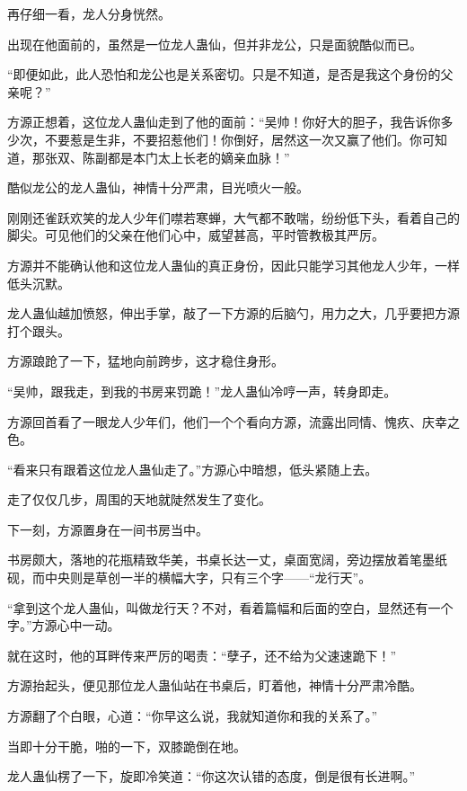 
\begin{this_body}

再仔细一看，龙人分身恍然。

出现在他面前的，虽然是一位龙人蛊仙，但并非龙公，只是面貌酷似而已。

“即便如此，此人恐怕和龙公也是关系密切。只是不知道，是否是我这个身份的父亲呢？”

方源正想着，这位龙人蛊仙走到了他的面前：“吴帅！你好大的胆子，我告诉你多少次，不要惹是生非，不要招惹他们！你倒好，居然这一次又赢了他们。你可知道，那张双、陈副都是本门太上长老的嫡亲血脉！”

酷似龙公的龙人蛊仙，神情十分严肃，目光喷火一般。

刚刚还雀跃欢笑的龙人少年们噤若寒蝉，大气都不敢喘，纷纷低下头，看着自己的脚尖。可见他们的父亲在他们心中，威望甚高，平时管教极其严厉。

方源并不能确认他和这位龙人蛊仙的真正身份，因此只能学习其他龙人少年，一样低头沉默。

龙人蛊仙越加愤怒，伸出手掌，敲了一下方源的后脑勺，用力之大，几乎要把方源打个跟头。

方源踉跄了一下，猛地向前跨步，这才稳住身形。

“吴帅，跟我走，到我的书房来罚跪！”龙人蛊仙冷哼一声，转身即走。

方源回首看了一眼龙人少年们，他们一个个看向方源，流露出同情、愧疚、庆幸之色。

“看来只有跟着这位龙人蛊仙走了。”方源心中暗想，低头紧随上去。

走了仅仅几步，周围的天地就陡然发生了变化。

下一刻，方源置身在一间书房当中。

书房颇大，落地的花瓶精致华美，书桌长达一丈，桌面宽阔，旁边摆放着笔墨纸砚，而中央则是草创一半的横幅大字，只有三个字——“龙行天”。

“拿到这个龙人蛊仙，叫做龙行天？不对，看着篇幅和后面的空白，显然还有一个字。”方源心中一动。

就在这时，他的耳畔传来严厉的喝责：“孽子，还不给为父速速跪下！”

方源抬起头，便见那位龙人蛊仙站在书桌后，盯着他，神情十分严肃冷酷。

方源翻了个白眼，心道：“你早这么说，我就知道你和我的关系了。”

当即十分干脆，啪的一下，双膝跪倒在地。

龙人蛊仙楞了一下，旋即冷笑道：“你这次认错的态度，倒是很有长进啊。”


\end{this_body}
